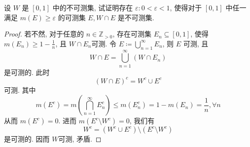 \documentclass[../main.tex]{subfiles}
\begin{document}
\begin{exercise}{}{}
设 $W$ 是 $[0,1]$ 中的不可测集, 试证明存在 $\varepsilon: 0 < \varepsilon < 1$, 使得对于 $[0,1]$ 中任一满足 $m(E) \ge \varepsilon$ 的可测集 $E, W \cap E$ 是不可测集.
\end{exercise}

\begin{proof}
    若不然, 对于任意的 \(  n \in \mathbb{Z} _{> 0}  \), 存在可测集 \(  E_{n}\subseteq \left[ 0,1 \right]   \), 使得 \(  m\left( E_{n} \right)\ge 1-\frac{1 }{n }    \), 且 \(  W\cap E_{n}  \)可测.    令 \(  E\coloneqq \bigcup _{n = 1}^{\infty}E_{n}  \), 则 \(  E  \)  可测, 且 \[
    W\cap E= \bigcup _{n = 1}^{\infty}\left( W\cap E_{n} \right) 
    \]是可测的. 此时 \[
    \left( W\cap E \right)^{c}= W^{c}\cup E^{c} 
    \]可测. 其中 \[
    m\left( E^{c} \right)= m\left( \bigcap _{n = 1}^{\infty}E_{n}^{c} \right)\le m\left( E_{n}^{c} \right)= 1-m\left( E_{n} \right)= \frac{1 }{n }     , \forall n
    \]从而 \(  m\left( E^{c} \right)= 0   \). 进而 \(  m\left( E^{c}\setminus W^{c} \right)= 0   \), 我们有 \[
    W^{c}= \left( W^{c}\cup E^{c} \right)\setminus \left( E^{c}\setminus W^{c} \right)  
    \] 是可测的. 因而 \(  W  \)可测,   矛盾. 
\end{proof}
\end{document}
